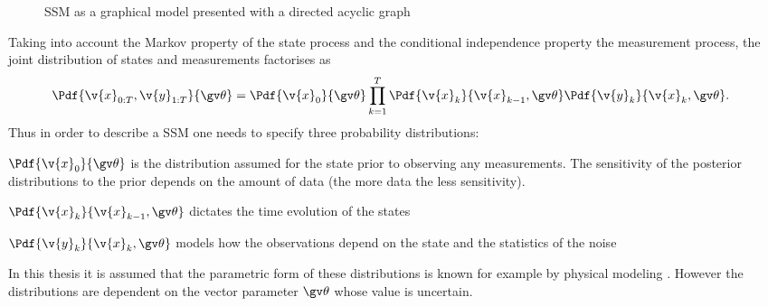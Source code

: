 \begin{figure}[!htp]
	\centering
	\caption{SSM as a graphical model presented with a directed acyclic graph}
	\label{fig:ssm_graphical}
\end{figure}

Taking into account the Markov property of the state process and the conditional
independence property the measurement process, the joint distribution of states
and measurements factorises as
\begin{align}
	\Pdf{\v{x}_{0:T},\v{y}_{1:T}}{\Th}&=\Pdf{\v{x}_0}{\Th}\prod_{k=1}^T\Pdf{\v{x}_k}{\v{x}_{k-1},\Th}\Pdf{\v{y}_k}{\v{x}_{k},\Th}
	\label{eq:joint_factorization}.
\end{align}
Thus in order to describe a SSM one needs to specify three probability distributions:
\begin{description}
\addtolength{\leftskip}{1cm}
	\item[Prior distribution]
	$\Pdf{\v{x}_0}{\Th}$ is the distribution assumed for the state prior to observing any measurements. The
	sensitivity of the posterior distributions to the prior depends on the amount of data (the more data the less sensitivity).
	\item[Dynamics model]
	$\Pdf{\v{x}_k}{\v{x}_{k-1},\Th}$ dictates the time evolution of the states
	\item[Measurement model]
	$\Pdf{\v{y}_k}{\v{x}_{k},\Th}$ models how the observations depend on the state and the statistics of the noise
\end{description}
In this thesis it is assumed that the parametric form of these distributions is known
for example by physical modeling \parencite{ljung1994modeling}. However the distributions are dependent on
the vector parameter $\Th$ whose value is uncertain.


